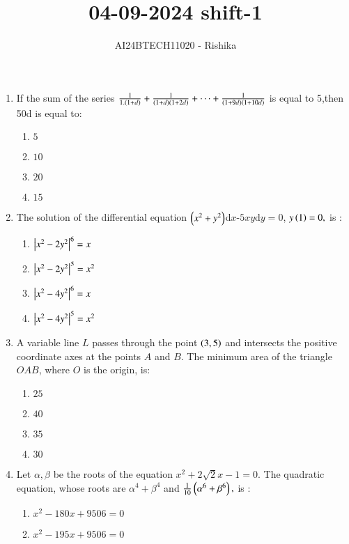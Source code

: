 \documentclass[journal,12pt,onecolumn]{IEEEtran}
\theoremstyle{remark}
\begin{document}

\vspace{3cm}

\title{04-09-2024 shift-1}
\author{AI24BTECH11020 - Rishika}
\maketitle
\bigskip
\renewcommand{\thefigure}{\theenumi}
\renewcommand{\thetable}{\theenumi}
\begin{enumerate}

	\item If the sum of the series $\frac{1}{1.\left(1+d\right)}+\frac{1}{\left(1+d\right)\left(1+2d\right)}+\cdots+\frac{1}{\left(1+9d\right)\left(1+10d\right)}$ is equal to 5,then 50d is equal to:   
     \begin{enumerate}
     \item $5$ \item $10$ \item $20$ \item $15$
     \end{enumerate}
\item The solution of the differential equation $\left(x^2+y^2\right)$d$x$-$5xy$d$y=0$, $y\left(1\right)=0,$ is :
      \begin{enumerate}
      \item $\left\vert x^2-2y^2\right\vert^6=x$
      \item $\left\vert x^2-2y^2\right\vert^5=x^2$
      \item $\left\vert x^2-4y^2\right\vert^6=x$
      \item $\left\vert x^2-4y^2\right\vert^5=x^2$
      \end{enumerate}
\item A variable line $L$ passes through the point $\left(3,5\right)$ and intersects the positive coordinate axes at the points $A$ and $B$. The minimum area of the triangle $OAB$, where $O$ is the origin, is:
     \begin{enumerate}
     \item $25$ \item $40$ \item $35$ \item $30$
     \end{enumerate}
\item Let $\alpha ,\beta $ be the roots of the equation $x^2+2\sqrt{2}x-1=0.$ The quadratic equation, whose roots are $\alpha^4+\beta^4$ and $\frac{1}{10}\left(\alpha^6+\beta^6\right),$ is :
     \begin{enumerate}
     \item $x^2-180x+9506=0$
     \item $x^2-195x+9506=0$

\end{enumerate}
\end{enumerate}
\end{document}
